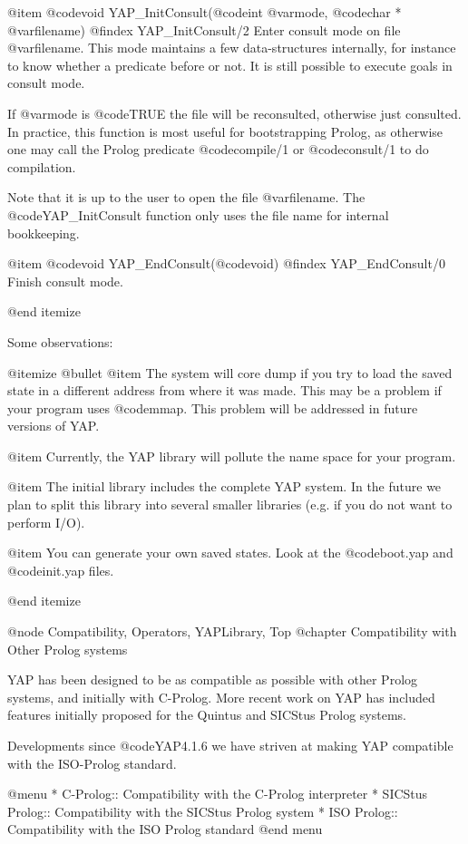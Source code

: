 {{{{{{{{{@item  @code{void} YAP_InitConsult(@code{int} @var{mode}, @code{char *} @var{filename})
@findex YAP_InitConsult/2
Enter consult mode on file @var{filename}. This mode maintains a few
data-structures internally, for instance to know whether a predicate
before or not. It is still possible to execute goals in consult mode.

If @var{mode} is @code{TRUE} the file will be reconsulted, otherwise
just consulted. In practice, this function is most useful for
bootstrapping Prolog, as otherwise one may call the Prolog predicate
@code{compile/1} or @code{consult/1} to do compilation.

Note that it is up to the user to open the file @var{filename}. The
@code{YAP_InitConsult} function only uses the file name for internal
bookkeeping.

@item  @code{void} YAP_EndConsult(@code{void})
@findex YAP_EndConsult/0
Finish consult mode.

@end itemize

Some observations:

@itemize @bullet
@item The system will core dump if you try to load the saved state in a
different address from where it was made. This may be a problem if
your program uses @code{mmap}. This problem will be addressed in future
versions of YAP.

@item Currently, the YAP library will pollute the name
space for your program.

@item The initial library includes the complete YAP system. In
the future we plan to split this library into several smaller libraries
(e.g. if you do not want to perform I/O).

@item You can generate your own saved states. Look at  the
@code{boot.yap} and @code{init.yap} files.

@end itemize

@node Compatibility, Operators, YAPLibrary, Top
@chapter Compatibility with Other Prolog systems

YAP has been designed to be as compatible as possible with
other Prolog systems, and initially with C-Prolog. More recent work on
YAP has included features initially proposed for the Quintus
and SICStus Prolog systems.

Developments since @code{YAP4.1.6} we have striven at making
YAP compatible with the ISO-Prolog standard. 

@menu
* C-Prolog:: Compatibility with the C-Prolog interpreter
* SICStus Prolog:: Compatibility with the SICStus Prolog system
* ISO Prolog::  Compatibility with the ISO Prolog standard
@end menu

}}}}}}}}}
